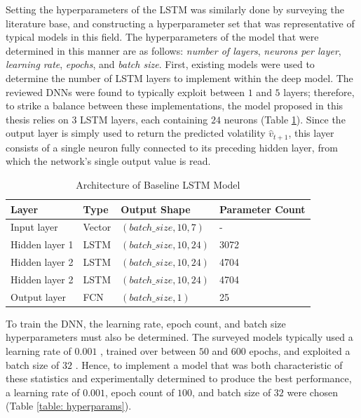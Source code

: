 \documentclass[a4paper, 11pt]{report}
\begin{document}
    Setting the hyperparameters of the LSTM was similarly done by surveying the literature base, and constructing a hyperparameter set that was representative of typical models in this field. The hyperparameters of the model that were determined in this manner are as follows: \emph{number of layers}, \emph{neurons per layer}, \emph{learning rate}, \emph{epochs}, and \emph{batch size}. First, existing models were used to determine the number of LSTM layers to implement within the deep model. The reviewed DNNs were found to typically exploit between $1$ \citep{bucci-2020} and $5$ \citep{kim-2018} layers; therefore, to strike a balance between these implementations, the model proposed in this thesis relies on $3$ LSTM layers, each containing $24$ neurons (Table \ref{table: architecture}). Since the output layer is simply used to return the predicted volatility $\hat{v}_{t+1}$, this layer consists of a single neuron fully connected to its preceding hidden layer, from which the network's single output value is read.


    \begin{table}[ht]
        \centering
        \begin{tabular}{|l|l|l|l|} 
        \hline
        \textbf{Layer} & \textbf{Type} & \textbf{Output Shape}   & \textbf{Parameter Count}  \\ 
        \hline
        Input layer    & Vector        & $(batch\_size, 10, 7)$  & -                         \\ 
        \hline
        Hidden layer 1 & LSTM          & $(batch\_size, 10, 24)$ & 3072                      \\ 
        \hline
        Hidden layer 2 & LSTM          & $(batch\_size, 10, 24)$ & 4704                      \\ 
        \hline
        Hidden layer 2 & LSTM          & $(batch\_size, 10, 24)$ & 4704                      \\ 
        \hline
        Output layer   & FCN           & $(batch\_size, 1)$      & 25                        \\
        \hline
        \end{tabular}
        \caption{\centering Architecture of Baseline LSTM Model}
        \label{table: architecture}
    \end{table}


    To train the DNN, the learning rate, epoch count, and batch size hyperparameters must also be determined. The surveyed models typically used a learning rate of $0.001$ \citep{zhang-2022}, trained over between $50$ \citep{rahimikia-2020} and $600$ \citep{xiong-2016} epochs, and exploited a batch size of $32$ \citep{xiong-2016}. Hence, to implement a model that was both characteristic of these statistics and experimentally determined to produce the best performance, a learning rate of $0.001$, epoch count of $100$, and batch size of $32$ were chosen (Table  \ref{table: hyperparams}).
\end{document}
